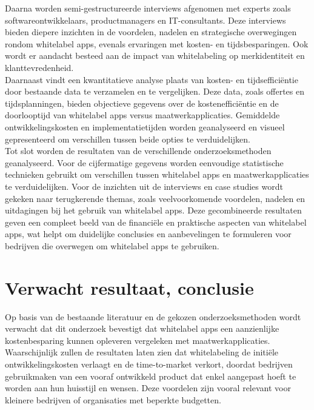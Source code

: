 Daarna worden semi-gestructureerde interviews afgenomen met experts zoals softwareontwikkelaars, productmanagers en IT-consultants. 
Deze interviews bieden diepere inzichten in de voordelen, nadelen en strategische overwegingen rondom whitelabel apps, evenals ervaringen met kosten- en tijdsbesparingen. 
Ook wordt er aandacht besteed aan de impact van whitelabeling op merkidentiteit en klanttevredenheid.\\

Daarnaast vindt een kwantitatieve analyse plaats van kosten- en tijdsefficiëntie door bestaande data te verzamelen en te vergelijken. 
Deze data, zoals offertes en tijdsplanningen, bieden objectieve gegevens over de kostenefficiëntie en de doorlooptijd van whitelabel apps versus maatwerkapplicaties. 
Gemiddelde ontwikkelingskosten en implementatietijden worden geanalyseerd en visueel gepresenteerd om verschillen tussen beide opties te verduidelijken.\\

Tot slot worden de resultaten van de verschillende onderzoeksmethoden geanalyseerd. Voor de cijfermatige gegevens worden eenvoudige statistische technieken gebruikt om verschillen tussen whitelabel apps en maatwerkapplicaties te verduidelijken. 
Voor de inzichten uit de interviews en case studies wordt gekeken naar terugkerende thema\textquotesingle s, zoals veelvoorkomende voordelen, nadelen en uitdagingen bij het gebruik van whitelabel apps. Deze gecombineerde resultaten geven een compleet beeld van de financiële en praktische aspecten van whitelabel apps, wat helpt om duidelijke conclusies en aanbevelingen te formuleren voor bedrijven die overwegen om whitelabel apps te gebruiken.

\section{Verwacht resultaat, conclusie}%
\label{sec:verwachte_resultaten}

Op basis van de bestaande literatuur en de gekozen onderzoeksmethoden wordt verwacht dat dit onderzoek bevestigt dat whitelabel apps een aanzienlijke kostenbesparing kunnen opleveren vergeleken met maatwerkapplicaties. 
Waarschijnlijk zullen de resultaten laten zien dat whitelabeling de initiële ontwikkelingskosten verlaagt en de time-to-market verkort, doordat bedrijven gebruikmaken van een vooraf ontwikkeld product dat enkel aangepast hoeft te worden aan hun huisstijl en wensen. 
Deze voordelen zijn vooral relevant voor kleinere bedrijven of organisaties met beperkte budgetten.\\

